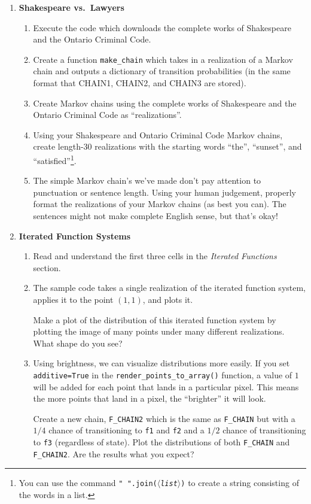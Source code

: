 \documentclass[letter]{article}
\newcommand{\var}[1]{{$\langle$\it #1$\rangle$}}
\begin{document}
\begin{enumerate}
		\item {\bf Shakespeare vs.~Lawyers}
		\begin{enumerate}
			\item Execute the code which downloads the complete works of Shakespeare and the Ontario Criminal Code.
			\item Create a function \verb|make_chain| which takes in a realization of a Markov chain and outputs
				a dictionary of transition probabilities (in the same format that CHAIN1, CHAIN2, and CHAIN3
				are stored).
			\item Create Markov chains using the complete works of Shakespeare and the Ontario Criminal Code
				as ``realizations''.
			\item Using your Shakespeare and Ontario Criminal Code Markov chains, create length-30 realizations
				with the starting words ``the'', ``sunset'', and ``satisfied''\footnote{ You can use the command
				{\tt " ".join(\var{list})} to create a string consisting of the words in a list.}.
			\item The simple Markov chain's we've made don't pay attention to punctuation or sentence length. Using
				your human judgement, properly format the realizations of your Markov chains (as best you can).
				The sentences might not make complete English sense, but that's okay!
		\end{enumerate}
	\item {\bf Iterated Function Systems}
		\begin{enumerate}
			\item Read and understand the first three cells in the \emph{Iterated Functions} section.
			\item The sample code takes a single realization of the iterated function system, applies
				it to the point $(1,1)$, and plots it.

				Make a plot of the distribution of this iterated function system by plotting the image
				of many points under many different realizations. What shape do you see?
			\item Using brightness, we can visualize distributions more easily. If you set {\tt additive=True}
				in the \verb|render_points_to_array()| function, a value of $1$ will be added for each
				point that lands in a particular pixel. This means the more points that land in a pixel,
				the ``brighter'' it will look.

				Create a new chain, \verb|F_CHAIN2| which is the same as \verb|F_CHAIN| but with a $1/4$ chance
				of transitioning to {\tt f1} and {\tt f2} and a $1/2$ chance of transitioning to {\tt f3} 
				(regardless of state). Plot the distributions of both \verb|F_CHAIN| and \verb|F_CHAIN2|. Are the 
				results what you expect?


\end{enumerate}
\end{enumerate}
\end{document}
